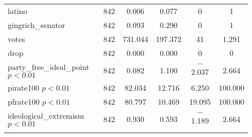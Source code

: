 \documentclass[12pt]{article}
\begin{document}
\begin{table}[!htbp]
\begin{tabular}{@{\extracolsep{5pt}}lccccc}
		latino & 842 & 0.006 & 0.077 & 0 & 1 \\ 
		gingrich\_senator & 842 & 0.093 & 0.290 & 0 & 1 \\ 
		votes & 842 & 731.044 & 197.372 & 41 & 1,291 \\ 
		drop & 842 & 0.000 & 0.000 & 0 & 0 \\ 
		\hline
		party\_free\_ideal\_point $ p < 0.01 $ & 842 & 0.082 & 1.100 & $-$2.037 & 2.664 \\ 
		pirate100 $ p < 0.01 $ & 842 & 82.034 & 12.716 & 6.250 & 100.000 \\ 
		pfrate100 $ p < 0.01 $ & 842 & 80.797 & 10.469 & 19.095 & 100.000 \\ 
		ideological\_extremism $ p < 0.01 $ & 842 & 0.930 & 0.593 & $-$1.189 & 2.664 \\  
		\hline \\[-1.8ex] 
	\end{tabular} 
\end{table} 
\end{document}
